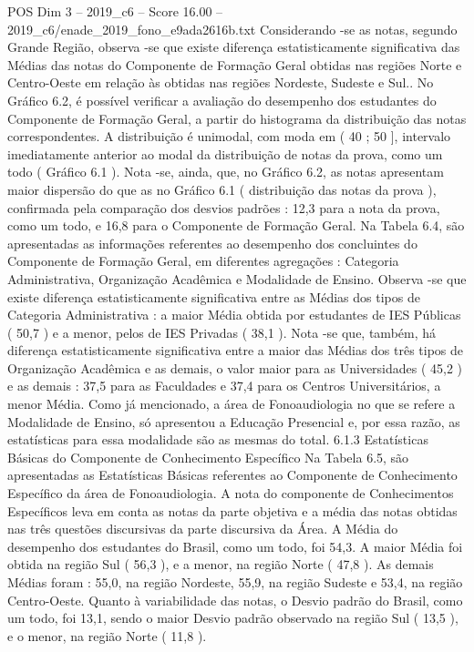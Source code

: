 \begin{textsample}{POS Dim 3 – 2019\_c6 – Score 16.00 – 2019\_c6/enade\_2019\_fono\_e9ada2616b.txt}
Considerando -se as notas, segundo Grande Região, observa -se que existe diferença estatisticamente significativa das Médias das notas do Componente de Formação Geral obtidas nas regiões Norte e Centro-Oeste em relação às obtidas nas regiões Nordeste, Sudeste e Sul..
No Gráfico 6.2, é possível verificar a avaliação do desempenho dos estudantes do Componente de Formação Geral, a partir do histograma da distribuição das notas correspondentes.
A distribuição é unimodal, com moda em ( 40 ; 50 ], intervalo imediatamente anterior ao modal da distribuição de notas da prova, como um todo ( Gráfico 6.1 ).
Nota -se, ainda, que, no Gráfico 6.2, as notas apresentam maior dispersão do que as no Gráfico 6.1 ( distribuição das notas da prova ), confirmada pela comparação dos desvios padrões : 12,3 para a nota da prova, como um todo, e 16,8 para o Componente de Formação Geral.
Na Tabela 6.4, são apresentadas as informações referentes ao desempenho dos concluintes do Componente de Formação Geral, em diferentes agregações : Categoria Administrativa, Organização Acadêmica e Modalidade de Ensino.
Observa -se que existe diferença estatisticamente significativa entre as Médias dos tipos de Categoria Administrativa : a maior Média obtida por estudantes de IES Públicas ( 50,7 ) e a menor, pelos de IES Privadas ( 38,1 ).
Nota -se que, também, há diferença estatisticamente significativa entre a maior das Médias dos três tipos de Organização Acadêmica e as demais, o valor maior para as Universidades ( 45,2 ) e as demais : 37,5 para as Faculdades e 37,4 para os Centros Universitários, a menor Média.
Como já mencionado, a área de Fonoaudiologia no que se refere a Modalidade de Ensino, só apresentou a Educação Presencial e, por essa razão, as estatísticas para essa modalidade são as mesmas do total. 6.1.3 Estatísticas Básicas do Componente de Conhecimento Específico Na Tabela 6.5, são apresentadas as Estatísticas Básicas referentes ao Componente de Conhecimento Específico da área de Fonoaudiologia.
A nota do componente de Conhecimentos Específicos leva em conta as notas da parte objetiva e a média das notas obtidas nas três questões discursivas da parte discursiva da Área.
A Média do desempenho dos estudantes do Brasil, como um todo, foi 54,3.
A maior Média foi obtida na região Sul ( 56,3 ), e a menor, na região Norte ( 47,8 ).
As demais Médias foram : 55,0, na região Nordeste, 55,9, na região Sudeste e 53,4, na região Centro-Oeste.
Quanto à variabilidade das notas, o Desvio padrão do Brasil, como um todo, foi 13,1, sendo o maior Desvio padrão observado na região Sul ( 13,5 ), e o menor, na região Norte ( 11,8 ).

\end{textsample}
